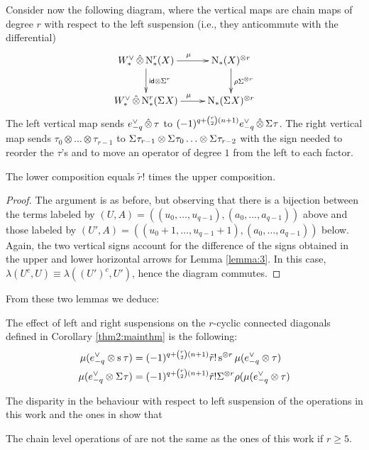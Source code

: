 Consider now the following diagram, where the vertical maps are chain maps of degree $r$ with respect to the left suspension (i.e., they anticommute with the differential)
\[
\xymatrix{
	\Wd\hotimes \rchains(X)\ar[r]^{\mu}\ar[d]^{\id\otimes \susp{r}} & \chains(X)^{\otimes r} \ar[d]^{\rho\susp{\otimes r}}
	\\
	\Wd\hotimes \rchains(\susp{} X)\ar[r]^{\mu} & \chains(\susp{}X)^{\otimes r}	
}
\]
The left vertical map sends $e_{-q}^\vee\operatorname{\hat{\otimes}} \tau$ to $(-1)^{q+\binom{r}{2}(n+1)}e_{-q}^\vee\operatorname{\hat{\otimes}} \Sigma^{}\tau$. The right vertical map sends $\tau_0\otimes \ldots\otimes \tau_{r-1}$ to $\Sigma^{}\tau_{r-1}\otimes \Sigma^{}\tau_0\ldots\otimes \Sigma^{}\tau_{r-2}$ with the sign needed to reorder the $\tau$'s and to move an operator of degree $1$ from the left to each factor. 
\begin{lemma}
	The lower composition equals $\tilde{r}!$ times the upper composition.
\end{lemma}
\begin{proof}
	The argument is as before, but observing that there is a bijection between the terms labeled by $(U,A) = ((u_0,\ldots,u_{q-1}),(a_0,\ldots,a_{q-1}))$ above and those labeled by $(U',A) = ((u_0+1,\ldots,u_{q-1}+1),(a_0,\ldots,a_{q-1}))$ below. Again, the two vertical signs account for the difference of the signs obtained in the upper and lower horizontal arrows for Lemma \ref{lemma:3}. In this case, $\lambda(U^c,U) \equiv \lambda((U')^c,U')$, hence the diagram commutes. 
\end{proof}
From these two lemmas we deduce:
\begin{proposition}\label{prop:suspensionconnected}
 The effect of left and right suspensions on the $r$-cyclic connected diagonals defined in Corollary \ref{thm2:mainthm} is the following:
 \begin{align*}
  \mu(e_{-q}^\vee \otimes \operatorname{s}^{}\tau) &= (-1)^{q + \binom{r}{2}(n+1)}\tilde{r}!\operatorname{s}^{\otimes r}\mu(e_{-q}^\vee \otimes \tau)
  \\
 \mu(e_{-q}^\vee \otimes \Sigma^{}\tau) &= (-1)^{q + \binom{r}{2}(n+1)}\tilde{r}!\Sigma^{\otimes r}\rho (\mu(e_{-q}^\vee \otimes \tau) 
 \end{align*}
\end{proposition}


The disparity in the behaviour with respect to left suspension of the operations in this work and the ones in \cite{medina2021may_st} show that
\begin{corollary}
	The chain level operations of \cite{medina2021may_st} are not the same as the ones of this work if $r\geq 5$.
\end{corollary}



